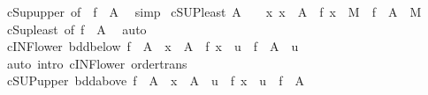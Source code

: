 \begin{isabellebody}
\isamarkupfalse%
\ cSup{\isacharunderscore}{\kern0pt}upper\ {\isacharbrackleft}{\kern0pt}of\ {\isacharunderscore}{\kern0pt}\ {\isachardoublequoteopen}f\ {\isacharbackquote}{\kern0pt}\ A{\isachardoublequoteclose}{\isacharbrackright}{\kern0pt}\ \isamarkupfalse%
\ simp%
\endisatagproof
{\isafoldproof}%
%
\isadelimproof
\isanewline
%
\endisadelimproof
\isanewline
{}\isamarkupfalse%
\ cSUP{\isacharunderscore}{\kern0pt}least{\isacharcolon}{\kern0pt}\ {\isachardoublequoteopen}A\ {\isasymnoteq}\ {\isacharbraceleft}{\kern0pt}{\isacharbraceright}{\kern0pt}\ {\isasymLongrightarrow}\ {\isacharparenleft}{\kern0pt}{\isasymAnd}x{\isachardot}{\kern0pt}\ x\ {\isasymin}\ A\ {\isasymLongrightarrow}\ f\ x\ {\isasymle}\ M{\isacharparenright}{\kern0pt}\ {\isasymLongrightarrow}\ {\isasymSqunion}{\isacharparenleft}{\kern0pt}f\ {\isacharbackquote}{\kern0pt}\ A{\isacharparenright}{\kern0pt}\ {\isasymle}\ M{\isachardoublequoteclose}\isanewline
%
\isadelimproof
\ \ %
\endisadelimproof
%
\isatagproof
{}\isamarkupfalse%
\ cSup{\isacharunderscore}{\kern0pt}least\ {\isacharbrackleft}{\kern0pt}of\ {\isachardoublequoteopen}f\ {\isacharbackquote}{\kern0pt}\ A{\isachardoublequoteclose}{\isacharbrackright}{\kern0pt}\ \isamarkupfalse%
\ auto%
\endisatagproof
{\isafoldproof}%
%
\isadelimproof
\isanewline
%
\endisadelimproof
\isanewline
{}\isamarkupfalse%
\ cINF{\isacharunderscore}{\kern0pt}lower{}{\isacharcolon}{\kern0pt}\ {\isachardoublequoteopen}bdd{\isacharunderscore}{\kern0pt}below\ {\isacharparenleft}{\kern0pt}f\ {\isacharbackquote}{\kern0pt}\ A{\isacharparenright}{\kern0pt}\ {\isasymLongrightarrow}\ x\ {\isasymin}\ A\ {\isasymLongrightarrow}\ f\ x\ {\isasymle}\ u\ {\isasymLongrightarrow}\ {\isasymSqinter}{\isacharparenleft}{\kern0pt}f\ {\isacharbackquote}{\kern0pt}\ A{\isacharparenright}{\kern0pt}\ {\isasymle}\ u{\isachardoublequoteclose}\isanewline
%
\isadelimproof
\ \ %
\endisadelimproof
%
\isatagproof
{}\isamarkupfalse%
\ {\isacharparenleft}{\kern0pt}auto\ intro{\isacharcolon}{\kern0pt}\ cINF{\isacharunderscore}{\kern0pt}lower\ order{\isacharunderscore}{\kern0pt}trans{\isacharparenright}{\kern0pt}%
\endisatagproof
{\isafoldproof}%
%
\isadelimproof
\isanewline
%
\endisadelimproof
\isanewline
{}\isamarkupfalse%
\ cSUP{\isacharunderscore}{\kern0pt}upper{}{\isacharcolon}{\kern0pt}\ {\isachardoublequoteopen}bdd{\isacharunderscore}{\kern0pt}above\ {\isacharparenleft}{\kern0pt}f\ {\isacharbackquote}{\kern0pt}\ A{\isacharparenright}{\kern0pt}\ {\isasymLongrightarrow}\ x\ {\isasymin}\ A\ {\isasymLongrightarrow}\ u\ {\isasymle}\ f\ x\ {\isasymLongrightarrow}\ u\ {\isasymle}\ {\isasymSqunion}{\isacharparenleft}{\kern0pt}f\ {\isacharbackquote}{\kern0pt}\ A{\isacharparenright}{\kern0pt}{\isachardoublequoteclose}\isanewline

\end{isabellebody}
